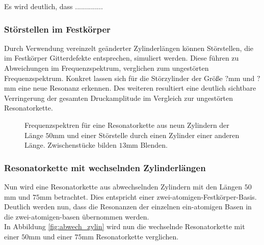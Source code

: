 \begin{figure}[H]
    \centering
    \hfil
    \hfil 
    \caption{}
    \label{fig:fest_10_blende}
\end{figure}
Es wird deutlich, dass ..............

\subsubsection*{Störstellen im Festkörper}
Durch Verwendung vereinzelt geänderter Zylinderlängen können Störstellen, die im Festkörper Gitterdefekte entsprechen, simuliert werden.
Diese führen zu Abweichungen im Frequenzspektrum, verglichen zum ungestörten Frequenzspektrum.
Konkret lassen sich für die Störzylinder der Größe $?$mm und $?$mm eine neue Resonanz erkennen. Des weiteren resultiert eine
deutlich sichtbare Verringerung der gesamten Druckamplitude im Vergleich zur ungestörten Resonatorkette. 

\begin{figure}[H]
    \centering
    \hfil
    \hfil 
    \caption{Frequenzspektren für eine Resonatorkette aus neun Zylindern der Länge $50$mm und einer Störstelle durch einen Zylinder einer anderen Länge. Zwischenstücke bilden $13$mm Blenden.}
    \label{fig:fest_stoer}
\end{figure}

\subsubsection*{Resonatorkette mit wechselnden Zylinderlängen}
Nun wird eine Resonatorkette aus abwechselnden Zylindern mit den Längen $50$mm und $75$mm betrachtet.
Dies entspricht einer zwei-atomigen-Festkörper-Basis. Deutlich werden nun, dass die Resonanzen der einzelnen ein-atomigen Basen in 
die zwei-atomigen-basen übernommen werden.\\
In Abbildung \ref{fig:abwech_zylin} wird nun die wechselnde Resonatorkette mit einer $50$mm und einer $75$mm Resonatorkette verglichen.

